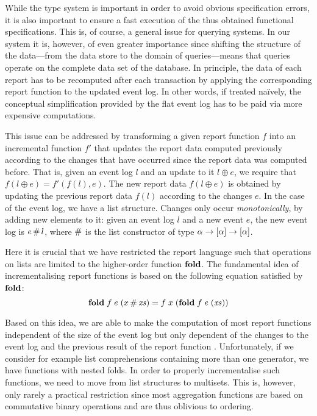 While the type system is important in order to avoid obvious
specification errors, it is also important to ensure a fast execution
of the thus obtained functional specifications. This is, of course, a
general issue for querying systems. In our system it is, however, of
even greater importance since shifting the structure of the
data---from the data store to the domain of queries---means that
queries operate on the complete data set of the database. In
principle, the data of each report has to be recomputed after each
transaction by applying the corresponding report function to the
updated event log. In other words, if treated na\"ively, the
conceptual simplification provided by the flat event log has to be
paid via more expensive computations.

This issue can be addressed by transforming a given report function
$f$ into an incremental function $f'$ that updates the report data
computed previously according to the changes that have occurred since
the report data was computed before. That is, given an event log $l$
and an update to it $l \oplus e$, we require that $f(l \oplus e) =
f'(f(l),e)$. The new report data $f(l \oplus e)$ is obtained by
updating the previous report data $f(l)$ according to the changes
$e$. In the case of the event log, we have a list structure. Changes
only occur \emph{monotonically}, by adding new elements to it: given
an event log $l$ and a new event $e$, the new event log is $e \mathop{\#}
l$, where $\mathop{\#}$ is the list constructor of type $\alpha \to
\left[\alpha\right] \to \left[\alpha\right]$.

Here it is crucial that we have restricted the report language such
that operations on lists are limited to the higher-order function
$\mathbf{fold}$. The fundamental idea of incrementalising report functions is
based on the following equation satisfied by $\mathbf{fold}$:
\[
\mathbf{fold}\; f\; e\; (x\mathop{\#} \mathit{xs}) = f\; x\; (\mathbf{fold}\; f\; e\;
(\mathit{xs}))
\]

Based on this idea, we are able to make the computation of most
report functions independent of the size of the event log but only dependent of
the changes to the event log and the previous result of the report function
\cite{nissen07ifl}. Unfortunately, if we consider for example list
comprehensions containing more than one generator, we have functions
with nested folds. In order to properly incrementalise such functions,
we need to move from list structures to multisets. This is, however,
only rarely a practical restriction since most aggregation functions
are based on commutative binary operations and are thus oblivious to
ordering.


